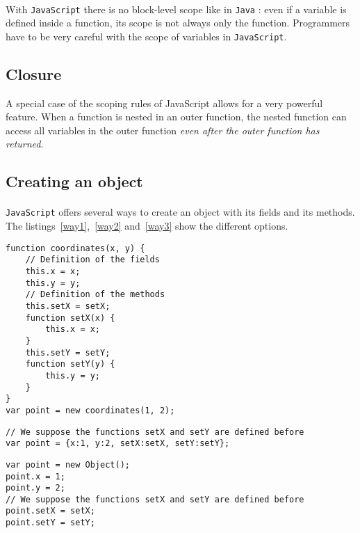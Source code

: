 \paragraph{}
With \texttt{JavaScript} there is no block-level scope like in \texttt{Java} : even if a variable is defined inside a function, its scope is not always only the function. Programmers have to be very careful with the scope of variables in \texttt{JavaScript}.
\subsection{Closure}
A special case of the scoping rules of JavaScript allows for a very powerful feature. When a function is nested in an outer function, the nested function can access all variables in the outer function \emph{even after the outer function has returned}.
\subsection{Creating an object}
\paragraph{}
\texttt{JavaScript} offers several ways to create an object with its fields and its methods. The listings~\ref{way1},~\ref{way2} and~\ref{way3} show the different options.
        
\begin{lstlisting}[caption={Creating an object with a constructor}, label={way1}]
function coordinates(x, y) {
    // Definition of the fields
    this.x = x;
    this.y = y;
    // Definition of the methods
    this.setX = setX;
    function setX(x) {
        this.x = x;
    }
    this.setY = setY;
    function setY(y) {
        this.y = y;
    }
}
var point = new coordinates(1, 2);
\end{lstlisting}
        
\begin{lstlisting}[caption=Creating an object with the "C-structure" syntax, label={way2}]
// We suppose the functions setX and setY are defined before
var point = {x:1, y:2, setX:setX, setY:setY};
\end{lstlisting}

\begin{lstlisting}[caption=Creating an object with the operator "new Object()", label={way3}]
var point = new Object();
point.x = 1;
point.y = 2;
// We suppose the functions setX and setY are defined before
point.setX = setX;
point.setY = setY;
\end{lstlisting}

